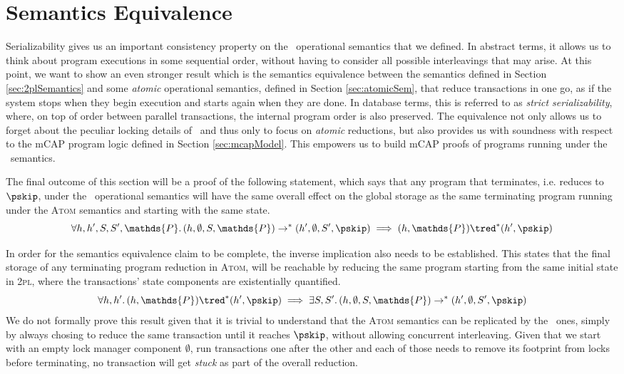 \section{Semantics Equivalence}

\label{sec:semEquiv}

Serializability gives us an important consistency property on the \tpl\ operational semantics that we defined. In abstract terms, it allows us to think about program executions in some sequential order, without having to consider all possible interleavings that may arise. At this point, we want to show an even stronger result which is the semantics equivalence between the semantics defined in Section \ref{sec:2plSemantics} and some \textit{atomic} operational semantics, defined in Section \ref{sec:atomicSem}, that reduce transactions in one go, as if the system stops when they begin execution and starts again when they are done. In database terms, this is referred to as \textit{strict serializability}, where, on top of order between parallel transactions, the internal program order is also preserved. The equivalence not only allows us to forget about the peculiar locking details of \tpl\ and thus only to focus on \textit{atomic} reductions, but also provides us with soundness with respect to the mCAP program logic defined in Section \ref{sec:mcapModel}. This empowers us to build mCAP proofs of programs running under the \tpl\ semantics.

The final outcome of this section will be a proof of the following statement, which says that any program that terminates, i.e. reduces to $\pskip$, under the \tpl\ operational semantics will have the same overall effect on the global storage as the same terminating program running under the \textsc{Atom} semantics and starting with the same state.
\[
	\forall h, h', S, S', \mathds{P} \ldotp
	(h, \emptyset, S, \mathds{P}) \rightarrow^* (h', \emptyset, S', \pskip) \implies 
	(h, \mathds{P}) \tred^* (h', \pskip)
\]

In order for the semantics equivalence claim to be complete, the inverse implication also needs to be established. This states that the final storage of any terminating program reduction in \textsc{Atom}, will be reachable by reducing the same program starting from the same initial state in \textsc{2pl}, where the transactions' state components are existentially quantified.
\[
	\forall h, h' \ldotp
	(h, \mathds{P}) \tred^* (h', \pskip)
	\implies
	\exists S, S' \ldotp
	(h, \emptyset, S, \mathds{P}) \rightarrow^* (h', \emptyset, S', \pskip)
\]
We do not formally prove this result given that it is trivial to understand that the \textsc{Atom} semantics can be replicated by the \tpl\ ones, simply by always chosing to reduce the same transaction until it reaches $\pskip$, without allowing concurrent interleaving. Given that we start with an empty lock manager component $\emptyset$, run transactions one after the other and each of those needs to remove its footprint from locks before terminating, no transaction will get \textit{stuck} as part of the overall reduction.

